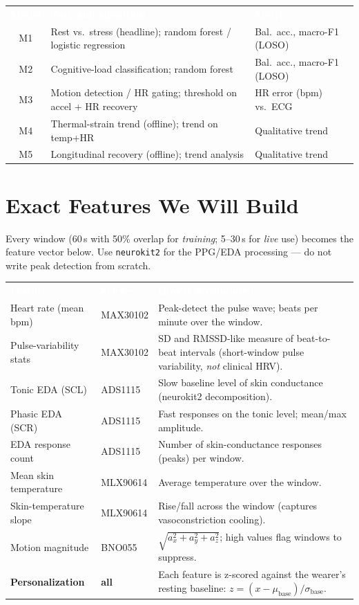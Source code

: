 \documentclass[11pt]{article}
\newcommand{\hd}[1]{\textbf{\sffamily\textcolor{white}{#1}}}
\begin{document}
\vspace{6pt}
{
\begin{tabularx}{\linewidth}{@{}c Y L@{}}
 \hd{Model} & \hd{Task and algorithm} & \hd{Metric} \\
M1 & Rest vs.\ stress (headline); random forest / logistic regression & Bal.\ acc., macro-F1 (LOSO) \\
M2 & Cognitive-load classification; random forest & Bal.\ acc., macro-F1 (LOSO) \\
M3 & Motion detection / HR gating; threshold on accel + HR recovery & HR error (bpm) vs.\ ECG \\
M4 & Thermal-strain trend (offline); trend on temp+HR & Qualitative trend \\
M5 & Longitudinal recovery (offline); trend analysis & Qualitative trend \\
\end{tabularx}}

\section{Exact Features We Will Build}\label{sec:features}

Every window (60\,s with 50\% overlap for \emph{training}; 5--30\,s for \emph{live} use) becomes the
feature vector below. Use \texttt{neurokit2} for the PPG/EDA processing --- do not write peak
detection from scratch.

{
\begin{tabularx}{\linewidth}{@{}L L Y@{}}
 \hd{Feature} & \hd{Sensor} & \hd{How it is computed} \\
Heart rate (mean bpm) & MAX30102 & Peak-detect the pulse wave; beats per minute over the window. \\
Pulse-variability stats & MAX30102 & SD and RMSSD-like measure of beat-to-beat intervals (short-window pulse variability, \emph{not} clinical HRV). \\
Tonic EDA (SCL) & ADS1115 & Slow baseline level of skin conductance (neurokit2 decomposition). \\
Phasic EDA (SCR) & ADS1115 & Fast responses on the tonic level; mean/max amplitude. \\
EDA response count & ADS1115 & Number of skin-conductance responses (peaks) per window. \\
Mean skin temperature & MLX90614 & Average temperature over the window. \\
Skin-temperature slope & MLX90614 & Rise/fall across the window (captures vasoconstriction cooling). \\
Motion magnitude & BNO055 & $\sqrt{a_x^2+a_y^2+a_z^2}$; high values flag windows to suppress. \\
 \textbf{Personalization} & \textbf{all} & Each feature is z-scored against the wearer's resting baseline: $z=(x-\mu_{\text{base}})/\sigma_{\text{base}}$. \\
\end{tabularx}}
\end{document}
